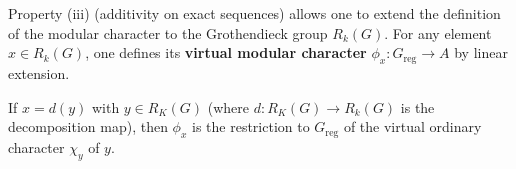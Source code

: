 Property (iii) (additivity on exact sequences) allows one to extend the definition of the modular character to the Grothendieck group $R_k(G)$. For any element $x \in R_k(G)$, one defines its \textbf{virtual modular character} $\phi_x: G_{\text{reg}} \to A$ by linear extension.

If $x = d(y)$ with $y \in R_K(G)$ (where $d: R_K(G) \to R_k(G)$ is the decomposition map), then $\phi_x$ is the restriction to $G_{\text{reg}}$ of the virtual ordinary character $\chi_y$ of $y$.
